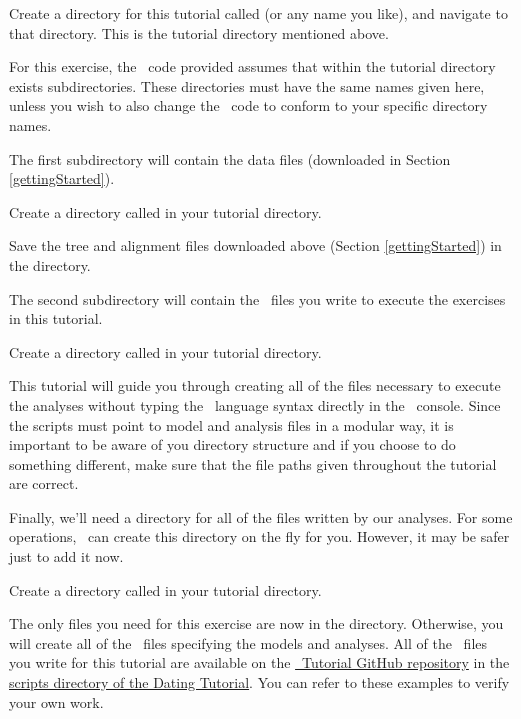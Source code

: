 \begin{framed}
Create a directory for this tutorial called {\textcolor{red}{}} (or any name you like), and navigate to that directory. This is the tutorial directory mentioned above.
\end{framed}

For this exercise, the \Rev~code provided assumes that within the tutorial directory exists  subdirectories. 
These directories must have the same names given here, unless you wish to also change the \Rev~code to conform to your specific directory names.

The first subdirectory will contain the data files (downloaded in Section \ref{gettingStarted}).
\begin{framed}
Create a directory called {\textcolor{red}{}} in your tutorial directory. 

Save the tree and alignment files downloaded above (Section \ref{gettingStarted}) in the  directory.
\end{framed}

The second subdirectory will contain the \Rev~files you write to execute the exercises in this tutorial. 
\begin{framed}
Create a directory called {\textcolor{red}{}} in your tutorial directory. 
\end{framed}
This tutorial will guide you through creating all of the files necessary to execute the analyses without typing the \Rev~language syntax directly in the \RevBayes~console. 
Since the scripts must point to model and analysis files in a modular way, it is important to be aware of you directory structure and if you choose to do something different, make sure that the file paths given throughout the tutorial are correct.

Finally, we'll need a directory for all of the files written by our analyses. For some operations, \RevBayes~can create this directory on the fly for you. 
However, it may be safer just to add it now.
\begin{framed}
Create a directory called {\textcolor{red}{}} in your tutorial directory.
\end{framed}

The only files you need for this exercise are now in the  directory. Otherwise, you will create all of the \Rev~files specifying the models and analyses. 
All of the \Rev~files you write for this tutorial are available on the \href{https://github.com/revbayes/revbayes_tutorial}{\RevBayes~Tutorial GitHub repository} in the \href{https://github.com/revbayes/revbayes_tutorial/tree/master/RB_Dating_Tutorial/scripts}{scripts directory of the Dating Tutorial}.
You can refer to these examples to verify your own work.

